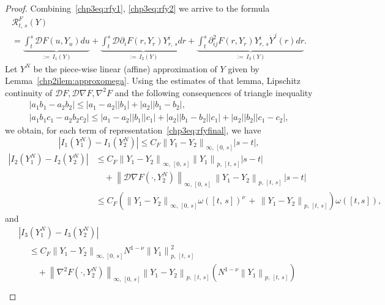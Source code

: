 \documentclass[AHL,Unicode,longabstracts,published]{cedram}
\newcommand{\calD}{\mathcal{D}}
\newcommand{\calR}{\mathcal{R}}
\begin{document}
\begin{proof}
Combining~\eqref{chp3eq:rfy1}, \eqref{chp3eq:rfy2} we arrive to the formula
\begin{multline}\label{chp3eq:rfyfinal}
\calR^{F}_{t,\,s}(Y)\\
=\underbrace{\int_t^s\calD F\left(u,Y_u\right)du}_{:=\,I_1(Y)}+\underbrace{\int_t^s\calD\partial_i F\left(r,Y_r\right)Y^i_{r,\,s}dr}_{:=\,I_2(Y)} +\underbrace{\int_t^s\partial^2_{ij} F\left(r,Y_r\right)Y^i_{r,\,s}\dot Y^j(r)dr}_{:=\,I_3(Y)}.
\end{multline}
Let $Y^N$ be the piece-wise linear (affine) approximation of $Y$ given by Lemma~\ref{chp2ilem:approxomega}. Using the estimates of that lemma, Lipschitz continuity of $\calD F, \calD\nabla F,\nabla ^2 F$ and the following consequences of triangle inequality
\begin{gather*}
\left|a_1b_1-a_2b_2\right|\leq \left|a_1-a_2\right|\left|b_1\right|+\left|a_2\right|\left|b_1-b_2\right|,
\\
\left|a_1b_1c_1-a_2b_2c_2\right|\leq \left|a_1-a_2\right|\left|b_1\right|\left|c_1\right|+\left|a_2\right|\left|b_1-b_2\right|\left|c_1\right|+\left|a_2\right|\left|b_2\right|\left|c_1-c_2\right|,
\end{gather*}
we obtain, for each term of representation~\eqref{chp3eq:rfyfinal}, we have
\[
\left|I_1\left(Y_1^N\right)-I_1\left(Y^N_2\right)\right|\leq C_F\left\|Y_1-Y_2\right\|_{\infty,\,[0,\,s]}|s-t|,
\]
\begin{align*}
\left|I_2\left(Y_1^N\right)-I_2\left(Y^N_2\right)\right|
&\leq C_F\left\|Y_1-Y_2\right\|_{\infty,\,[0,\,s]}\left\|Y_1\right\|_{p,\,[t,\,s]}|s-t|\\
&\quad+\left\|\calD\nabla F\left(\cdot, Y^N_2\right)\right\|_{\infty,\,[0,\,s]}\, \left\|Y_1-Y_2\right\|_{p,\,[t,\,s]}\, |s-t|\\
&\leq C_{F}\left(\left\|Y_1-Y_2\right\|_{\infty,\,[0,\,s]} \omega\left([t,\,s]\right)^{\nu}\, +\,\left\|Y_1-Y_2\right\|_{p,\,[t,\,s]}\right) \omega([t,s]),
\end{align*}
and
\begin{multline*}
\left|I_3\left(Y_1^N\right)-I_3\left(Y^N_2\right)\right|\\
\begin{aligned}
&\leq C_F\left\|Y_1-Y_2\right\|_{\infty,\,[0,\,s]} N^{1-\nu}\left\|Y_1\right\|^2_{p,\,[t,\,s]}\\
&\quad+\left\|\nabla^2 F\left(\cdot, Y^N_2\right)\right\|_{\infty,\,[0,\,s]}\left\|Y_1-Y_2\right\|_{p,\,[t,\,s]} \left(N^{1-\nu}\left\|Y_1\right\|_{p,\,[t,\,s]}\right)\\

\end{aligned}
\end{multline*}
\end{proof}
\end{document}
